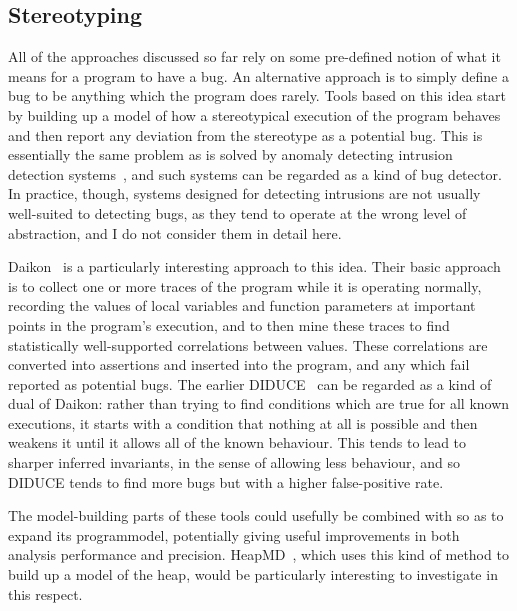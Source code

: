 \subsection{Stereotyping}
\label{sect:rw:stereotyping}

All of the approaches discussed so far rely on some pre-defined notion
of what it means for a program to have a bug.  An alternative approach
is to simply define a bug to be anything which the program does
rarely.  Tools based on this idea start by building up a model of how
a stereotypical execution of the program behaves and then report any
deviation from the stereotype as a potential bug.  This is essentially
the same problem as is solved by anomaly detecting intrusion detection
systems~\cite{Forrest1996a}, and such systems can be regarded as a kind
of bug detector.  In practice, though, systems designed for detecting
intrusions are not usually well-suited to detecting bugs, as they tend
to operate at the wrong level of abstraction, and I do not consider
them in detail here.

Daikon~\cite{Ernst2007} is a particularly interesting approach to this
idea.  Their basic approach is to collect one or more traces of the
program while it is operating normally, recording the values of local
variables and function parameters at important points in the program's
execution, and to then mine these traces to find statistically
well-supported correlations between values.  These correlations are
converted into assertions and inserted into the program, and any which
fail reported as potential bugs.  The earlier DIDUCE~\cite{Hangal2002}
can be regarded as a kind of dual of Daikon: rather than trying to
find conditions which are true for all known executions, it starts
with a condition that nothing at all is possible and then weakens it
until it allows all of the known behaviour.  This tends to lead to
sharper inferred invariants, in the sense of allowing less behaviour,
and so DIDUCE tends to find more bugs but with a higher false-positive
rate.

The model-building parts of these tools could usefully be combined
with {\technique} so as to expand its \gls{programmodel}, potentially
giving useful improvements in both analysis performance and precision.
HeapMD~\cite{Chilimbi2006}, which uses this kind of method to build up
a model of the heap, would be particularly interesting to investigate
in this respect.

